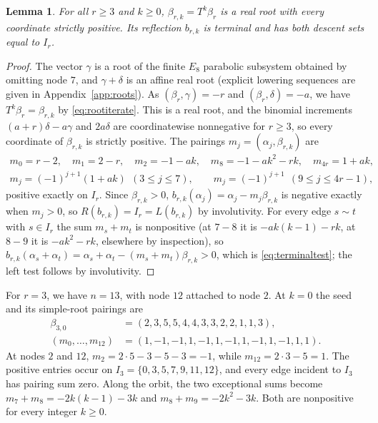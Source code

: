 \documentclass[10pt]{article}
\newtheorem{lemma}[theorem]{Lemma}
\theoremstyle{remark}
\begin{document}
\begin{lemma}\label{lem:uniformdescents}
For all $r\geq3$ and $k\geq0$, $\beta_{r,k}=T^k\beta_r$ is a real root with
every coordinate strictly positive. Its reflection $b_{r,k}$ is terminal
and has both descent sets equal to $I_r$.
\end{lemma}
\begin{proof}
The vector $\gamma$ is a root of the finite $E_8$ parabolic subsystem
obtained by omitting node $7$, and $\gamma+\delta$ is an affine real root
(explicit lowering sequences are given in Appendix~\ref{app:roots}). As $(\beta_r,\gamma)=-r$ and
$(\beta_r,\delta)=-a$, we have
$T^k\beta_r=\beta_{r,k}$ by \eqref{eq:rootiterate}. This is a real root,
and the binomial increments
$(a+r)\delta-a\gamma$ and $2a\delta$ are coordinatewise nonnegative for
$r\geq3$, so every coordinate of $\beta_{r,k}$ is strictly positive. The
pairings $m_j=(\alpha_j,\beta_{r,k})$ are
\begin{gather*}
 m_0=r-2,\quad m_1=2-r,\quad m_2=-1-ak,\quad m_8=-1-ak^2-rk,\quad
 m_{4r}=1+ak,\\
 m_j=(-1)^{j+1}(1+ak)\ \ (3\leq j\leq7),\qquad
 m_j=(-1)^{j+1}\ \ (9\leq j\leq4r-1),
\end{gather*}
positive exactly on $I_r$. Since $\beta_{r,k}>0$,
$b_{r,k}(\alpha_j)=\alpha_j-m_j\beta_{r,k}$ is negative exactly when
$m_j>0$, so $R(b_{r,k})=I_r=L(b_{r,k})$ by involutivity. For every edge
$s\sim t$ with $s\in I_r$ the sum $m_s+m_t$ is nonpositive (at $7-8$ it is
$-ak(k-1)-rk$, at $8-9$ it is $-ak^2-rk$, elsewhere by inspection), so
$b_{r,k}(\alpha_s+\alpha_t)=\alpha_s+\alpha_t-(m_s+m_t)\beta_{r,k}>0$,
which is \eqref{eq:terminaltest}; the left test follows by involutivity.
\end{proof}

For $r=3$, we have $n=13$, with node $12$ attached to node $2$.
At $k=0$ the seed and its simple-root pairings are
\[
 \begin{split}
 \beta_{3,0}&=(2,3,5,5,4,4,3,3,2,2,1,1,3),\\
 (m_0,\ldots,m_{12})&=(1,-1,-1,1,-1,1,-1,1,-1,1,-1,1,1).
 \end{split}
\]
At nodes $2$ and $12$,
$m_2=2\cdot5-3-5-3=-1$, while $m_{12}=2\cdot3-5=1$.
The positive entries occur on
$I_3=\{0,3,5,7,9,11,12\}$, and every edge incident to $I_3$ has pairing
sum zero. Along the orbit, the two exceptional sums become
$m_7+m_8=-2k(k-1)-3k$ and $m_8+m_9=-2k^2-3k$.
Both are nonpositive for every integer $k\geq0$.
\end{document}
